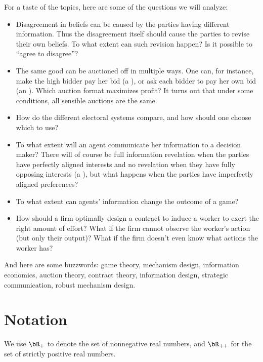 For a taste of the topics, here are some of the questions we will analyze: 
\begin{itemize}
  \item Disagreement in beliefs can be caused by the parties having different information.
    Thus the disagreement itself should cause the parties to revise their own beliefs.
    To what extent can such revision happen?
    Is it possible to ``agree to disagree''?
  \item The same good can be auctioned off in multiple ways.
    One can, for instance, make the high bidder pay her bid (a ), or ask each bidder to pay her own bid (an ).
    Which auction format maximizes profit?
    It turns out that under some conditions, all sensible auctions are the same.
  \item How do the different electoral systems compare, and how should one choose which to use?
  \item To what extent will an agent communicate her information to a decision maker?
    There will of course be full information revelation when the parties have perfectly aligned interests and no revelation when they have fully opposing interests (a ), but what happens when the parties have imperfectly aligned preferences?
  \item To what extent can agents' information change the outcome of a game?
  \item How should a firm optimally design a contract to induce a worker to exert the right amount of effort?
    What if the firm cannot observe the worker's action (but only their output)?
    What if the firm doesn't even know what actions the worker has?
\end{itemize}

And here are some buzzwords: game theory, mechanism design, information economics, auction theory, contract theory, information design, strategic communication, robust mechanism design.


\section{Notation}
We use \(\bR_+\) to denote the set of nonnegative real numbers, and \(\bR_{++}\) for the set of strictly positive real numbers.


